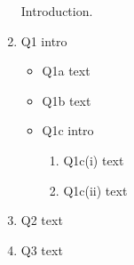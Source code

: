 

\begin{enumerate}
 Introduction.
 \item Q1 intro
  \begin{itemize}
   \item Q1a text
   \item Q1b text
   \item Q1c intro
    \begin{enumerate}
    \item Q1c(i) text
    \item Q1c(ii) text
    \end{enumerate}
  \end{itemize}
 \item Q2 text
 \item Q3 text
\end{enumerate}


